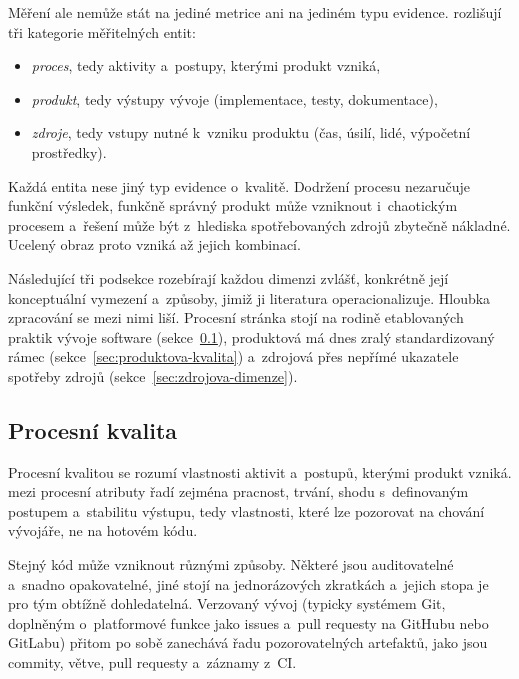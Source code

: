 Měření ale nemůže stát na jediné metrice ani na jediném typu
evidence. \textcite{fenton2014} rozlišují tři kategorie
měřitelných entit:
\begin{itemize}
    \item \textit{proces}, tedy aktivity a~postupy, kterými
          produkt vzniká,
    \item \textit{produkt}, tedy výstupy vývoje (implementace,
          testy, dokumentace),
    \item \textit{zdroje}, tedy vstupy nutné k~vzniku produktu
          (čas, úsilí, lidé, výpočetní prostředky).
\end{itemize}
\label{sec:mereni-kvality-obecne}%
\label{sec:mereni-kvality}%
Každá entita nese jiný typ evidence o~kvalitě. Dodržení procesu
nezaručuje funkční výsledek, funkčně správný produkt může vzniknout
i~chaotickým procesem a~řešení může být z~hlediska spotřebovaných
zdrojů zbytečně nákladné. Ucelený obraz proto vzniká až jejich
kombinací.

Následující tři podsekce rozebírají každou dimenzi zvlášť, konkrétně její
konceptuální vymezení a~způsoby, jimiž ji literatura
operacionalizuje. Hloubka zpracování se mezi nimi liší. Procesní
stránka stojí na rodině etablovaných praktik vývoje software
(sekce~\ref{sec:procesni-kvalita}), produktová má dnes zralý
standardizovaný rámec (sekce~\ref{sec:produktova-kvalita})
a~zdrojová přes nepřímé ukazatele spotřeby zdrojů
(sekce~\ref{sec:zdrojova-dimenze}).

\subsection{Procesní kvalita}
\label{sec:procesni-kvalita}
\label{sec:praktiky-kvality}
\label{sec:faze-zivotniho-cyklu}

Procesní kvalitou se rozumí vlastnosti aktivit a~postupů, kterými
produkt vzniká. \textcite{fenton2014} mezi procesní
atributy řadí zejména pracnost, trvání, shodu s~definovaným postupem
a~stabilitu výstupu, tedy vlastnosti, které lze pozorovat na chování
vývojáře, ne na hotovém kódu.

Stejný kód může vzniknout různými způsoby. Některé jsou auditovatelné
a~snadno opakovatelné, jiné stojí na jednorázových zkratkách a~jejich
stopa je pro tým obtížně dohledatelná. Verzovaný vývoj (typicky
systémem Git, doplněným o~platformové funkce jako issues a~pull
requesty na GitHubu nebo GitLabu) přitom po sobě zanechává řadu
pozorovatelných artefaktů, jako jsou commity, větve, pull requesty a~záznamy
z~CI.

